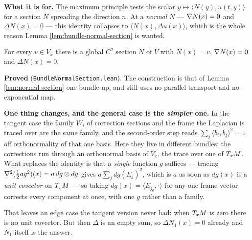 \begin{lemma}
  \textbf{What it is for.} The maximum principle tests the scalar
  $y \mapsto \langle N(y), u(t,y)\rangle$ for a section $N$ spreading the direction $n$. At a
  \emph{normal} $N$ --- $\nabla N(x) = 0$ and $\Delta N(x) = 0$ --- this identity collapses to
  $\langle N(x), \Delta u(x)\rangle$, which is the whole reason Lemma
  \ref{lem:bundle-normal-section} is wanted.
\end{lemma}

\begin{lemma}
  \label{lem:bundle-normal-section}
  \leanok
  For every $v \in V_x$ there is a global $C^2$ section $N$ of $V$ with $N(x) = v$,
  $\nabla N(x) = 0$ and $\Delta N(x) = 0$.

  \textbf{Proved} (\texttt{BundleNormalSection.lean}). The construction is that of Lemma
  \ref{lem:normal-section} one bundle up, and still uses no parallel transport and no
  exponential map.

  \textbf{One thing changes, and the general case is the \emph{simpler} one.} In the tangent
  case the family $W_i$ of correction sections and the frame the Laplacian is traced over are
  the same family, and the second-order step reads $\sum_j \langle b_i,b_j\rangle^2 = 1$ off
  orthonormality of that one basis. Here they live in different bundles: the corrections run
  through an orthonormal basis of $V_x$, the trace over one of $T_xM$. What replaces the
  identity is that a \emph{single} function $g$ suffices --- tracing
  $\nabla^2(\tfrac12 a g^2)(x) = a\,dg\otimes dg$ gives $a\sum_j dg(E_j)^2$, which is $a$ as
  soon as $dg(x)$ is a \emph{unit covector} on $T_xM$ --- so taking
  $dg(x) = \langle E_{j_0},\cdot\rangle$ for any one frame vector corrects every component at
  once, with one $g$ rather than a family.

  That leaves an edge case the tangent version never had: when $T_xM$ is zero there is no
  unit covector. But then $\Delta$ is an empty sum, so $\Delta N_1(x) = 0$ already and $N_1$
  itself is the answer.


\end{lemma}
